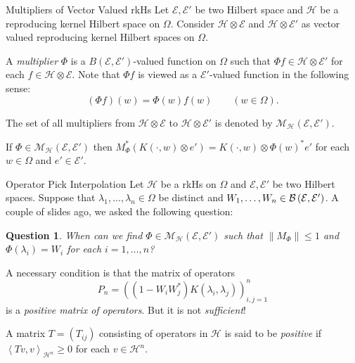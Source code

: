 \documentclass{beamer}
\newtheorem{question}[theorem]{Question}
\renewcommand{\le}{\leqslant}
\renewcommand{\ge}{\geqslant}
\newcommand{\calE}{{\mathcal E}}
\newcommand{\calH}{{\mathcal H}}
\newcommand{\calM}{{\mathcal M}}
\newcommand{\ip}[1]{\left\langle #1 \right\rangle}
\newcommand{\norm}[1]{\left\lVert #1 \right\rVert}
\begin{document}
\begin{frame}{Multipliers of Vector Valued rkHs}
Let $\calE, \calE'$ be two Hilbert space and $\calH$ be a reproducing kernel Hilbert space on $\Omega$. Consider $\calH \otimes \calE$ and $\calH \otimes \calE '$ as vector valued reproducing kernel Hilbert spaces on $\Omega$.

\pause

A \textit{multiplier} $\Phi$ is a $B\left( \calE , \calE' \right)$-valued function on $\Omega$ such that $\Phi f \in \calH \otimes \calE '$ for each $f \in \calH \otimes \calE$. Note that $\Phi f$ is viewed as a $\calE '$-valued function in the following sense:
\begin{equation*}
(\Phi f)(w) =  \Phi(w) f(w) \qquad (w \in \Omega).
\end{equation*}

The set of all multipliers from $\calH \otimes \calE$ to $\calH \otimes \calE'$ is denoted by $\calM _{\calH} \left( \calE , \calE' \right)$.

\pause

\begin{lemma}
If $\Phi \in \calM _{\calH} \left( \calE , \calE' \right)$ then $M_{\Phi}^{*} \left( K\left( \cdot , w \right) \otimes e' \right) = K\left( \cdot, w \right) \otimes \Phi(w) ^{*} e'$ for each $w\in \Omega$ and $e' \in \calE'$.
\end{lemma}
\end{frame}

\begin{frame}{Operator Pick Interpolation}
Let $\calH$ be a rkHs on $\Omega$ and $\calE , \calE'$ be two Hilbert spaces.
\pause
Suppose that $\lambda_{1}, \ldots, \lambda_{n} \in \Omega$ be distinct and $W_{1}, \ldots , W_{n} \in \cal{B} \left( \calE , \calE' \right)$. A couple of slides ago, we asked the following question:
\begin{question}
When can we find $\Phi \in \calM_{\calH} \left( \calE , \calE' \right)$ such that $\norm{M_{\Phi}} \le 1$ and $\Phi \left( \lambda_{i} \right) = W_{i}$ for each $i=1, \ldots , n$?
\end{question}
\pause
A necessary condition is that the matrix of operators
\begin{equation*}
P_{n} = \left( \left( 1-W_{i} W_{j}^{*} \right) K\left( \lambda_{i}, \lambda_{j} \right) \right)_{i,j=1}^{n}
\end{equation*}
is a \textit{positive matrix of operators}. But it is not \textit{sufficient}!

\pause
\begin{definition}
A matrix $T=\left( T_{ij} \right)$ consisting of operators in $\calH$ is said to be \textit{positive} if $\ip{Tv,v}_{\calH ^{n}} \ge 0$ for each $v\in \calH ^{n}$.
\end{definition}
\end{frame}
\end{document}
